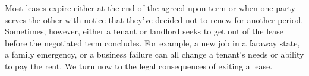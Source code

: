 Most leases expire either at the end of the agreed-upon term or when one party
serves the other with notice that they've decided not to renew for another
period.  Sometimes, however, either a tenant or landlord seeks to get out of
the lease before the negotiated term concludes. For example, a new job in a
faraway state, a family emergency, or a business failure can all change a
tenant's needs or ability to pay the rent.  We turn now to the legal
consequences of exiting a lease.  


